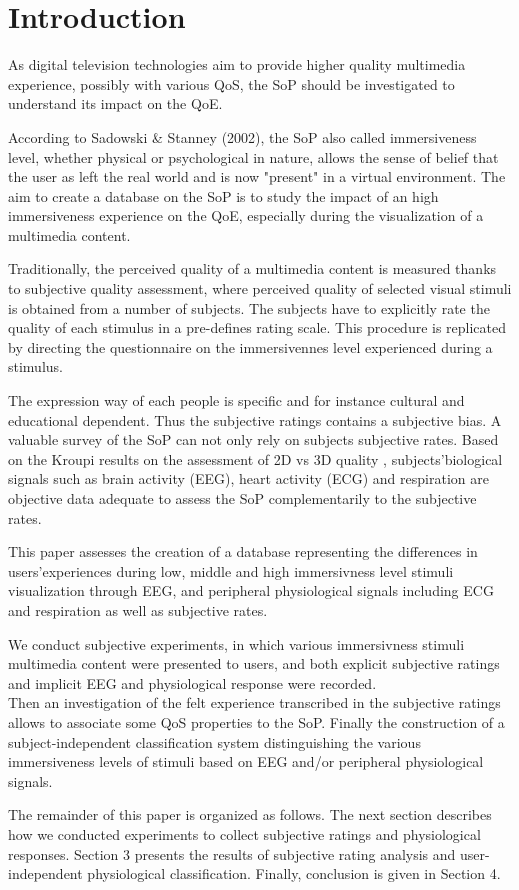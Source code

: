 \section{Introduction}
As digital television technologies aim to provide higher quality multimedia experience, possibly with various \ac{QoS}, the \ac{SoP} should be investigated to understand its impact on the \ac{QoE}.

According to Sadowski \& Stanney (2002), the \ac{SoP} also called immersiveness level, whether physical or psychological in nature, allows the sense of belief that the user as left the real world and is now "present" in a virtual environment. The aim to create a database on the \ac{SoP} is to study the impact of an high immersiveness experience on the \ac{QoE}, especially during the visualization of a multimedia content.

Traditionally, the perceived quality of a multimedia content is measured thanks to subjective quality assessment, where perceived quality of selected visual stimuli is obtained from a number of subjects. The subjects have to explicitly rate the quality of each stimulus in a pre-defines rating scale. This procedure is replicated by directing the questionnaire on the immersivennes level experienced during a stimulus.

The expression way of each people is specific and for instance cultural and educational dependent. Thus the subjective ratings contains a subjective bias. A valuable survey of the \ac{SoP} can not only rely on subjects subjective rates. Based on the Kroupi results on the assessment of 2D vs 3D quality \cite{2Dvs3D}, subjects'biological signals such as brain activity (\ac{EEG}), heart activity (\ac{ECG}) and respiration are objective data adequate to assess the \ac{SoP} complementarily to the subjective rates.

This paper assesses the creation of a database representing the differences in users'experiences during low, middle and high immersivness level stimuli visualization through \ac{EEG}, and peripheral physiological signals including \ac{ECG} and respiration as well as subjective rates.

We conduct subjective experiments, in which various immersivness stimuli multimedia content were presented to users, and both explicit subjective ratings and implicit \ac{EEG} and physiological response were recorded.
\\Then an investigation of the felt experience transcribed in the subjective ratings allows to associate some \ac{QoS} properties to the \ac{SoP}. Finally the construction of a subject-independent classification system distinguishing the various immersiveness levels of stimuli based on \ac{EEG} and/or peripheral physiological signals.

The remainder of this paper is organized as follows.
The next section describes how we conducted experiments to collect subjective ratings and physiological responses. Section 3 presents the results of subjective rating analysis and user-independent physiological classification. Finally, conclusion is given in Section 4.